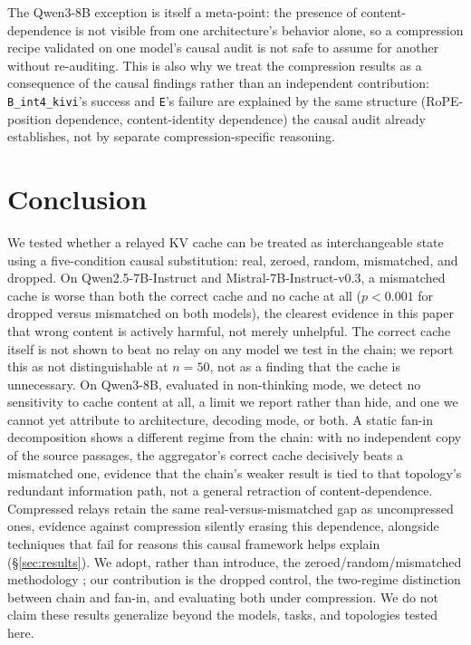 \documentclass[11pt]{article}
\begin{document}
The Qwen3-8B exception is itself a meta-point: the presence of
content-dependence is not visible from one architecture's behavior
alone, so a compression recipe validated on one model's causal audit is
not safe to assume for another without re-auditing. This is also why we
treat the
compression results as a consequence of the causal findings rather than
an independent contribution: \texttt{B\_int4\_kivi}'s success and
\texttt{E}'s failure are explained by the same structure (RoPE-position
dependence, content-identity dependence) the causal audit already
establishes, not by separate compression-specific reasoning.

\section{Conclusion}

We tested whether a relayed KV cache can be treated as interchangeable
state using a five-condition causal substitution: real, zeroed,
random, mismatched, and dropped. On Qwen2.5-7B-Instruct and
Mistral-7B-Instruct-v0.3, a mismatched cache is worse than both the
correct cache and no cache at all ($p<0.001$ for dropped versus
mismatched on both models), the clearest evidence in this paper that
wrong content is actively harmful, not merely unhelpful. The correct
cache itself is not shown to beat no relay on any model we test in the
chain; we report this as not distinguishable at $n=50$, not as a
finding that the cache is unnecessary. On Qwen3-8B, evaluated in
non-thinking mode, we detect no sensitivity to cache content at all, a
limit we report rather than hide, and one we cannot yet attribute to
architecture, decoding mode, or both. A static fan-in decomposition
shows a different regime from the chain: with no independent copy of
the source passages, the aggregator's correct cache decisively beats a
mismatched one, evidence that the chain's weaker result is tied to
that topology's redundant information path, not a general retraction
of content-dependence. Compressed relays retain the same
real-versus-mismatched gap as uncompressed ones, evidence against
compression silently erasing this dependence, alongside techniques that
fail for reasons this causal framework helps explain
(\S\ref{sec:results}). We adopt, rather than introduce, the
zeroed/random/mismatched methodology \citep{latentcommpay2026}; our
contribution is the dropped control, the two-regime distinction between
chain and fan-in, and evaluating both under compression. We do not
claim these results generalize beyond the models, tasks, and
topologies tested here.
\end{document}
